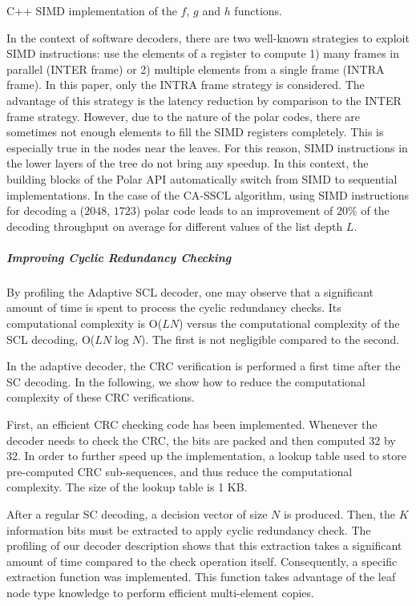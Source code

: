\begin{listing}[htp]
  \inputminted[frame=lines,linenos]{C++}{main/chapter2/src/polar/f_g_h_simd.cpp}
  \caption{C++ SIMD implementation of the $f$, $g$ and $h$ functions.}
  \label{lst:polar_f_g_h_simd}
\end{listing}

In the context of software decoders, there are two well-known strategies to
exploit SIMD instructions: use the elements of a register to compute 1) many
frames in parallel (INTER frame) or 2) multiple elements from a single frame
(INTRA frame). In this paper, only the INTRA frame strategy is considered. The
advantage of this strategy is the latency reduction by comparison to the INTER
frame strategy. However, due to the nature of the polar codes, there are
sometimes not enough elements to fill the SIMD registers completely. This is
especially true in the nodes near the leaves. For this reason, SIMD instructions
in the lower layers of the tree do not bring any speedup. In this context, the
building blocks of the Polar API automatically switch from SIMD to sequential
implementations. In the case of the CA-SSCL algorithm, using SIMD instructions
for decoding a ($2048$, $1723$) polar code leads to an improvement of $20\%$ of
the decoding throughput on average for different values of the list depth $L$.

\subparagraph{Improving Cyclic Redundancy Checking}
\label{subsec:crc_improv}

By profiling the Adaptive SCL decoder, one may observe that a significant amount
of time is spent to process the cyclic redundancy checks. Its computational
complexity is O($LN$) versus the computational complexity of the SCL decoding,
O($LN\log N$). The first is not negligible compared to the second.

In the adaptive decoder, the CRC verification is performed a first time after
the SC decoding. In the following, we show how to reduce the computational
complexity of these CRC verifications.

First, an efficient CRC checking code has been implemented. Whenever the decoder
needs to check the CRC, the bits are packed and then computed 32 by 32. In order
to further speed up the implementation, a lookup table used to store
pre-computed CRC sub-sequences, and thus reduce the computational complexity.
The size of the lookup table is 1 KB.

After a regular SC decoding, a decision vector of size $N$ is produced. Then,
the $K$ information bits must be extracted to apply cyclic redundancy check. The
profiling of our decoder description shows that this extraction takes a
significant amount of time compared to the check operation itself. Consequently,
a specific extraction function was implemented. This function takes advantage of
the leaf node type knowledge to perform efficient multi-element copies.

